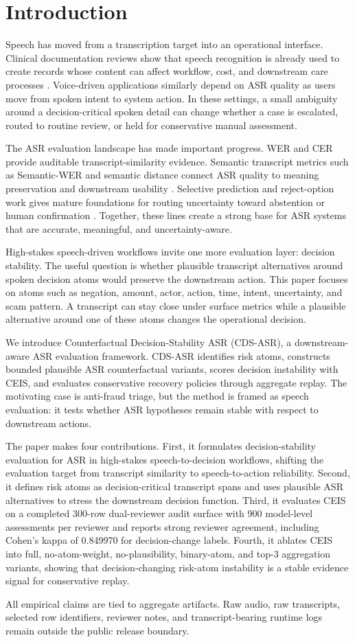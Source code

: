 \section{Introduction}

Speech has moved from a transcription target into an operational interface. Clinical documentation reviews show that speech recognition is already used to create records whose content can affect workflow, cost, and downstream care processes \citep{hodgson2016risks,blackley2019speech}. Voice-driven applications similarly depend on ASR quality as users move from spoken intent to system action. In these settings, a small ambiguity around a decision-critical spoken detail can change whether a case is escalated, routed to routine review, or held for conservative manual assessment.

The ASR evaluation landscape has made important progress. WER and CER provide auditable transcript-similarity evidence. Semantic transcript metrics such as Semantic-WER and semantic distance connect ASR quality to meaning preservation and downstream usability \citep{roy2021semantic,kim2022semdist}. Selective prediction and reject-option work gives mature foundations for routing uncertainty toward abstention or human confirmation \citep{chow1970reject,angelopoulos2021conformal}. Together, these lines create a strong base for ASR systems that are accurate, meaningful, and uncertainty-aware.

High-stakes speech-driven workflows invite one more evaluation layer: decision stability. The useful question is whether plausible transcript alternatives around spoken decision atoms would preserve the downstream action. This paper focuses on atoms such as negation, amount, actor, action, time, intent, uncertainty, and scam pattern. A transcript can stay close under surface metrics while a plausible alternative around one of these atoms changes the operational decision.

We introduce Counterfactual Decision-Stability ASR (CDS-ASR), a downstream-aware ASR evaluation framework. CDS-ASR identifies risk atoms, constructs bounded plausible ASR counterfactual variants, scores decision instability with CEIS, and evaluates conservative recovery policies through aggregate replay. The motivating case is anti-fraud triage, but the method is framed as speech evaluation: it tests whether ASR hypotheses remain stable with respect to downstream actions.

The paper makes four contributions. First, it formulates decision-stability evaluation for ASR in high-stakes speech-to-decision workflows, shifting the evaluation target from transcript similarity to speech-to-action reliability. Second, it defines risk atoms as decision-critical transcript spans and uses plausible ASR alternatives to stress the downstream decision function. Third, it evaluates CEIS on a completed 300-row dual-reviewer audit surface with 900 model-level assessments per reviewer and reports strong reviewer agreement, including Cohen's kappa of 0.849970 for decision-change labels. Fourth, it ablates CEIS into full, no-atom-weight, no-plausibility, binary-atom, and top-3 aggregation variants, showing that decision-changing risk-atom instability is a stable evidence signal for conservative replay.

All empirical claims are tied to aggregate artifacts. Raw audio, raw transcripts, selected row identifiers, reviewer notes, and transcript-bearing runtime logs remain outside the public release boundary.
